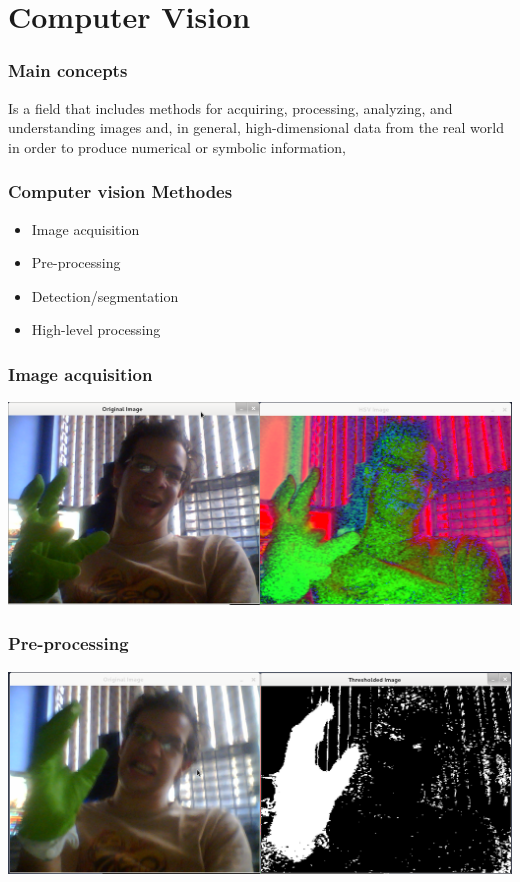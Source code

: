 \documentclass{beamer}
\begin{document}
\section{Computer Vision}
\begin{frame}
\frametitle{Main concepts}
Is a field that includes methods for acquiring, processing, analyzing, and understanding images and, in general, high-dimensional data from the real world in order to produce numerical or symbolic information,
\end{frame}
\begin{frame}
\frametitle{Computer vision Methodes}
\begin{itemize}
\item Image acquisition
\item Pre-processing
\item Detection/segmentation
\item High-level processing
\end{itemize}
\end{frame}
\begin{frame}
\frametitle{Image acquisition}
\begin{center}
\includegraphics[scale=0.25]{pic01.png}
\end{center}
\end{frame}
\begin{frame}
\frametitle{Pre-processing}
\begin{center}
\includegraphics[scale=0.25]{pic02.png}
\end{center}
\end{frame}
\end{document}
